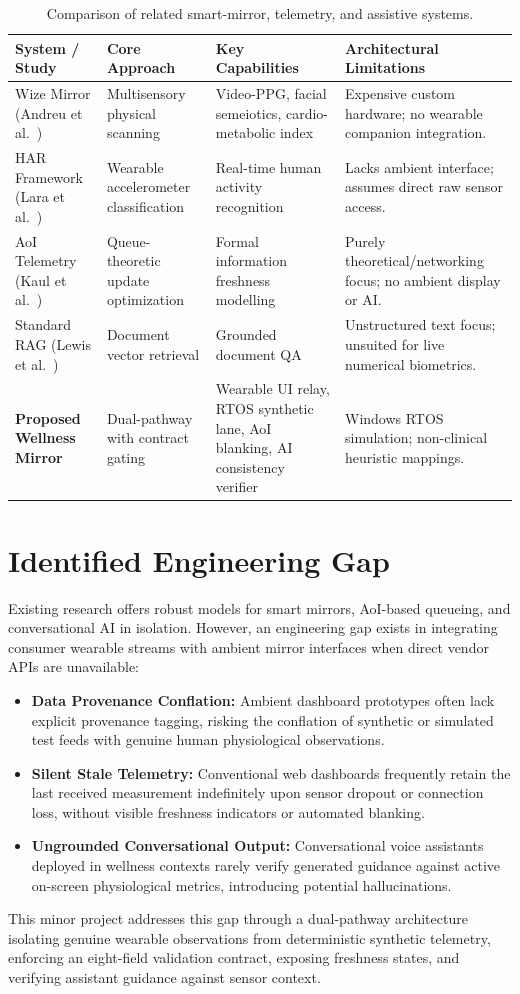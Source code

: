 \begin{table}[H]
\centering
\footnotesize
\renewcommand{\arraystretch}{1.04}
\caption{Comparison of related smart-mirror, telemetry, and assistive systems.}
\label{tab:literature-comparison}
\begin{tabularx}{\textwidth}{p{28mm}p{25mm}p{38mm}Y}
\toprule
\textbf{System / Study} & \textbf{Core Approach} & \textbf{Key Capabilities} & \textbf{Architectural Limitations}\\
\midrule
Wize Mirror (Andreu et al.~\cite{andreu2016wize}) & Multisensory physical scanning & Video-PPG, facial semeiotics, cardio-metabolic index & Expensive custom hardware; no wearable companion integration.\\
HAR Framework (Lara et al.~\cite{lara2013survey}) & Wearable accelerometer classification & Real-time human activity recognition & Lacks ambient interface; assumes direct raw sensor access.\\
AoI Telemetry (Kaul et al.~\cite{kaul2012realtime}) & Queue-theoretic update optimization & Formal information freshness modelling & Purely theoretical/networking focus; no ambient display or AI.\\
Standard RAG (Lewis et al.~\cite{lewis2020rag}) & Document vector retrieval & Grounded document QA & Unstructured text focus; unsuited for live numerical biometrics.\\
\midrule
\textbf{Proposed Wellness Mirror} & Dual-pathway with contract gating & Wearable UI relay, RTOS synthetic lane, AoI blanking, AI consistency verifier & Windows RTOS simulation; non-clinical heuristic mappings.\\
\bottomrule
\end{tabularx}
\end{table}

\section{Identified Engineering Gap}
Existing research offers robust models for smart mirrors, AoI-based queueing, and conversational AI in isolation. However, an engineering gap exists in integrating consumer wearable streams with ambient mirror interfaces when direct vendor APIs are unavailable:
\begin{itemize}[noitemsep,topsep=1pt]
  \item \textbf{Data Provenance Conflation:} Ambient dashboard prototypes often lack explicit provenance tagging, risking the conflation of synthetic or simulated test feeds with genuine human physiological observations.
  \item \textbf{Silent Stale Telemetry:} Conventional web dashboards frequently retain the last received measurement indefinitely upon sensor dropout or connection loss, without visible freshness indicators or automated blanking.
  \item \textbf{Ungrounded Conversational Output:} Conversational voice assistants deployed in wellness contexts rarely verify generated guidance against active on-screen physiological metrics, introducing potential hallucinations.
\end{itemize}

This minor project addresses this gap through a dual-pathway architecture isolating genuine wearable observations from deterministic synthetic telemetry, enforcing an eight-field validation contract, exposing freshness states, and verifying assistant guidance against sensor context.